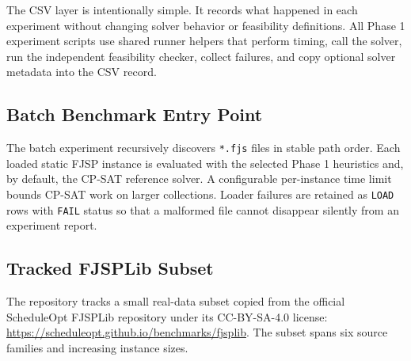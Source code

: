 ﻿\documentclass[11pt]{article}
\begin{document}
The CSV layer is intentionally simple. It records what happened in each
experiment without changing solver behavior or feasibility definitions.
All Phase 1 experiment scripts use shared runner helpers that perform timing,
call the solver, run the independent feasibility checker, collect failures,
and copy optional solver metadata into the CSV record.

\subsection{Batch Benchmark Entry Point}

The batch experiment recursively discovers \texttt{*.fjs} files in stable path
order. Each loaded static FJSP instance is evaluated with the selected Phase 1
heuristics and, by default, the CP-SAT reference solver. A configurable
per-instance time limit bounds CP-SAT work on larger collections. Loader
failures are retained as \texttt{LOAD} rows with \texttt{FAIL} status so that a
malformed file cannot disappear silently from an experiment report.

\subsection{Tracked FJSPLib Subset}

The repository tracks a small real-data subset copied from the official
ScheduleOpt FJSPLib repository under its CC-BY-SA-4.0 license:
\url{https://scheduleopt.github.io/benchmarks/fjsplib}.
The subset spans six source families and increasing instance sizes.
\end{document}
